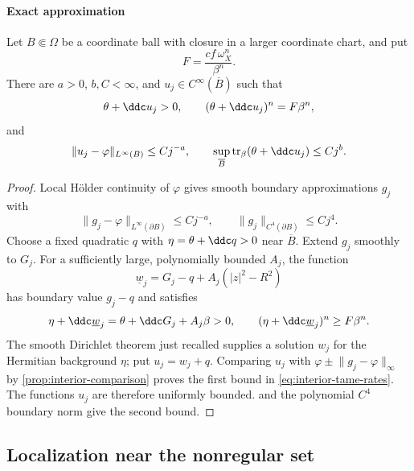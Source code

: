 \paragraph{Exact approximation}

\begin{proposition}\label{prop:interior-tame-approximants}
Let $B\Subset\Omega$ be a coordinate ball with closure in a larger coordinate chart, and put
\[
  F=\frac{cf\,\omega_X^n}{\beta^n}.
\]
There are $a>0$, $b,C<\infty$, and $u_j\in C^\infty(\overline B)$ such that
\begin{equation}\label{eq:interior-exact-approximants}
  \theta+\ddc u_j>0,
  \qquad
  (\theta+\ddc u_j)^n=F\beta^n,
\end{equation}
and
\begin{equation}\label{eq:interior-tame-rates}
  \lVert u_j-\varphi\rVert_{L^\infty(B)}\leq Cj^{-a},
  \qquad
  \sup_{\overline B}\operatorname{tr}_\beta(\theta+\ddc u_j)\leq Cj^b.
\end{equation}
\end{proposition}

\begin{proof}
Local H\"older continuity of $\varphi$ gives smooth boundary approximations $g_j$ with
\[
  \lVert g_j-\varphi\rVert_{L^\infty(\partial B)}\leq Cj^{-a},
  \qquad
  \lVert g_j\rVert_{C^4(\partial B)}\leq Cj^4.
\]
Choose a fixed quadratic $q$ with $\eta=\theta+\ddc q>0$ near $\overline B$. Extend $g_j$ smoothly to $G_j$. For a sufficiently large, polynomially bounded $A_j$, the function
\[
  \underline w_j=G_j-q+A_j(|z|^2-R^2)
\]
has boundary value $g_j-q$ and satisfies
\[
  \eta+\ddc\underline w_j
  =\theta+\ddc G_j+A_j\beta>0,
  \qquad
  (\eta+\ddc\underline w_j)^n\geq F\beta^n.
\]
The smooth Dirichlet theorem just recalled supplies a solution $w_j$ for the Hermitian background $\eta$; put $u_j=w_j+q$. Comparing $u_j$ with $\varphi\pm\lVert g_j-\varphi\rVert_\infty$ by \cref{prop:interior-comparison} proves the first bound in \eqref{eq:interior-tame-rates}. The functions $u_j$ are therefore uniformly bounded.  and the polynomial $C^4$ boundary norm give the second bound.
\end{proof}

\subsection{Localization near the nonregular set}\label{sec:interior-localization}

